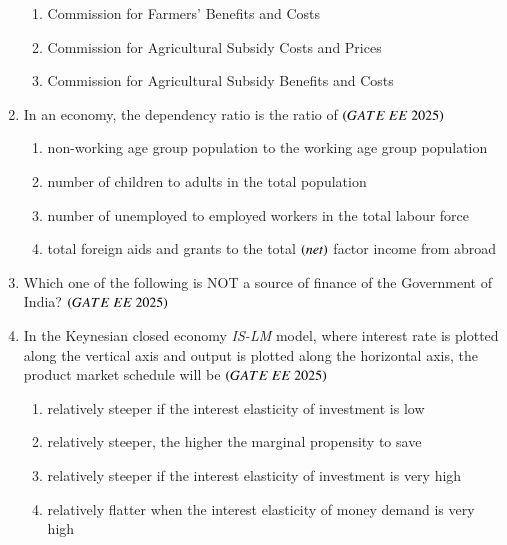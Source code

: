 \documentclass[journal,12pt,onecolumn]{IEEEtran}
\theoremstyle{remark}
\begin{document}
\begin{enumerate}
\begin{enumerate}
    \item Commission for Farmers' Benefits and Costs
    \item Commission for Agricultural Subsidy Costs and Prices
    \item Commission for Agricultural Subsidy Benefits and Costs
 \end{enumerate}
\item In an economy, the dependency ratio is the ratio of
\hfill $\brak{GATE\ EE\ 2025}$
    \begin{enumerate}
    \item non-working age group population to the working age group population
    \item number of children to adults in the total population
    \item number of unemployed to employed workers in the total labour force
    \item total foreign aids and grants to the total  $\left(net\right)$ factor income from abroad
  \end{enumerate}
\item Which one of the following is NOT a source of finance of the Government of India?
\hfill $\brak{GATE\ EE\ 2025}$
    \begin{enumerate}
       \end{enumerate}
\item In the Keynesian closed economy \textit{IS-LM} model, where interest rate is plotted along the vertical axis and output is plotted along the horizontal axis, the product market schedule will be
\hfill $\brak{GATE\ EE\ 2025}$
    \begin{enumerate}
    \item relatively steeper if the interest elasticity of investment is low
    \item relatively steeper, the higher the marginal propensity to save
    \item relatively steeper if the interest elasticity of investment is very high
    \item relatively flatter when the interest elasticity of money demand is very high
    \end{enumerate}

\end{enumerate}
\end{document}

